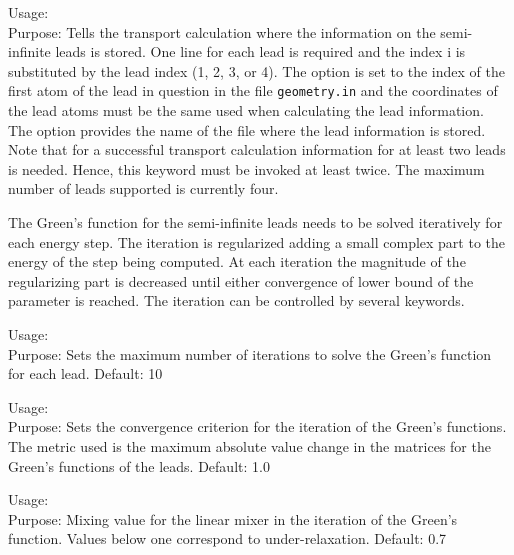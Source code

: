 {
  \noindent
  Usage:     \\[1.0ex]
  Purpose: Tells the transport calculation where the information on
  the semi-infinite leads is stored. One line for each lead is
  required and the index i is substituted by the lead index (1, 2, 3,
  or 4). The option  is set to the index of the
  first atom of the lead in question in the file \texttt{geometry.in}
  and the coordinates of the lead atoms must be the same used when
  calculating the lead information. The option 
  provides the name of the file where the lead information is
  stored. Note that for a successful transport calculation information
  for at least two leads is needed. Hence, this keyword must be
  invoked at least twice. The maximum number of leads supported is
  currently four.}

The Green's function for the semi-infinite leads needs to be solved
iteratively for each energy step. The iteration is regularized adding
a small complex part to the energy of the step being computed. At each
iteration the magnitude of the regularizing part is decreased until
either convergence of lower bound of the parameter is reached. The
iteration can be controlled by several keywords.

{
  \noindent
  Usage:    \\[1.0ex]
  Purpose: Sets the maximum number of iterations to solve the Green's
  function for each lead. Default: 10 }

{
  \noindent
  Usage:    \\[1.0ex]
  Purpose: Sets the convergence criterion for the iteration of the
  Green's functions. The metric used is the maximum absolute value
  change in the matrices for the Green's functions of the
  leads. Default: 1.0 }

{
  \noindent
  Usage:    \\[1.0ex]
  Purpose: Mixing value for the linear mixer in the iteration of the
  Green's function. Values below one correspond to
  under-relaxation. Default: 0.7}

